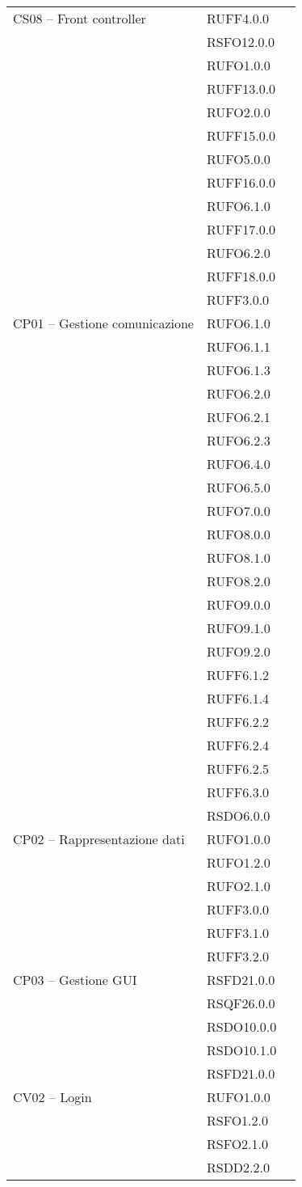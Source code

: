 \begin{center}
\begin{longtable}{lp{}l}
CS08 -- Front controller & RUFF4.0.0 \\
 & RSFO12.0.0 \\
 & RUFO1.0.0 \\
 & RUFF13.0.0 \\
 & RUFO2.0.0 \\
 & RUFF15.0.0 \\
 & RUFO5.0.0 \\
 & RUFF16.0.0 \\
 & RUFO6.1.0 \\
 & RUFF17.0.0 \\
 & RUFO6.2.0 \\
 & RUFF18.0.0 \\
 & RUFF3.0.0 \\
 
CP01 -- Gestione comunicazione & RUFO6.1.0\\
& RUFO6.1.1\\
& RUFO6.1.3\\
& RUFO6.2.0\\
& RUFO6.2.1\\
& RUFO6.2.3\\
& RUFO6.4.0\\
& RUFO6.5.0\\
& RUFO7.0.0\\
& RUFO8.0.0\\
& RUFO8.1.0\\
& RUFO8.2.0\\
& RUFO9.0.0\\
& RUFO9.1.0\\
& RUFO9.2.0\\
& RUFF6.1.2\\
& RUFF6.1.4\\
& RUFF6.2.2\\
& RUFF6.2.4\\
& RUFF6.2.5\\
& RUFF6.3.0\\
& RSDO6.0.0\\
CP02 -- Rappresentazione dati & RUFO1.0.0\\
& RUFO1.2.0\\
& RUFO2.1.0\\
& RUFF3.0.0\\
& RUFF3.1.0\\
& RUFF3.2.0\\
CP03 -- Gestione GUI & RSFD21.0.0\\
& RSQF26.0.0\\
& RSDO10.0.0\\
& RSDO10.1.0\\
& RSFD21.0.0\\
CV02 -- Login & RUFO1.0.0\\
& RSFO1.2.0\\
& RSFO2.1.0\\
& RSDD2.2.0\\
\bottomrule
\end{longtable}
\end{center}
